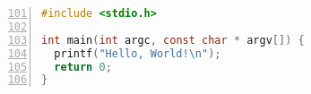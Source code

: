 \begin{lstlisting}[language=C, numbers=left, firstnumber=101, label=helloworld]
#include <stdio.h>

int main(int argc, const char * argv[]) {
  printf("Hello, World!\n");
  return 0;
}
\end{lstlisting}
